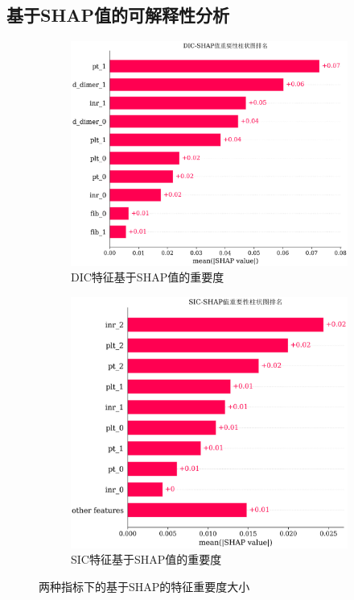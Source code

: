 \documentclass[12pt, a4paper, oneside]{ctexart}
\numberwithin{equation}{section}  %
\begin{document}
\subsection{基于SHAP值的可解释性分析}
\begin{figure}[H]
   \hspace{-1.7cm}
   \begin{subfigure}[b]{0.6\textwidth}
       \includegraphics[scale=0.6]{SHAP/shap_dic_bar}
       \caption{DIC特征基于SHAP值的重要度}
   \end{subfigure}
   \begin{subfigure}[b]{0.6\textwidth}
       \includegraphics[scale=0.55]{SHAP/shap_sic_bar}
       \caption{SIC特征基于SHAP值的重要度}
   \end{subfigure}
   \caption{两种指标下的基于SHAP的特征重要度大小}
   \label{fig-shap-bar}
\end{figure}
\end{document}
